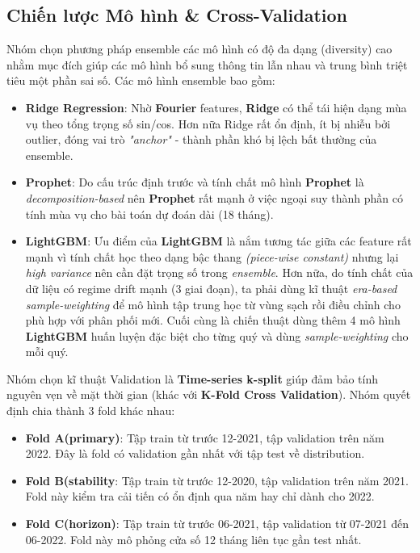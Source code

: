 \documentclass{article}
\begin{document}
\subsection{Chiến lược Mô hình \& Cross-Validation}

Nhóm chọn phương pháp ensemble các mô hình có độ đa dạng (diversity) cao
nhằm mục đích giúp các mô hình bổ sung thông tin lẫn nhau và trung bình triệt tiêu một phần sai số. Các mô hình ensemble bao gồm:
\begin{itemize}
    \item \textbf{Ridge Regression}: Nhờ \textbf{Fourier} features, \textbf{Ridge} có thể tái hiện dạng mùa vụ theo tổng trọng số sin/cos. Hơn nữa Ridge rất ổn định, ít bị nhiễu bởi outlier, đóng vai trò \textit{"anchor"} - thành phần khó bị lệch bất thường của ensemble.
    \item \textbf{Prophet}: Do cấu trúc định trước và tính chất mô hình \textbf{Prophet} là \textit{decomposition-based} nên \textbf{Prophet} rất mạnh ở việc ngoại suy thành phần có tính mùa vụ cho bài toán dự đoán dài (18 tháng).

    \item \textbf{LightGBM}: Ưu điểm của \textbf{LightGBM} là nắm tương tác giữa các feature rất mạnh vì tính chất học theo dạng bậc thang \textit{(piece-wise constant)} nhưng lại \textit{high variance} nên cần đặt trọng số trong \textit{ensemble}. Hơn nữa, do tính chất của dữ liệu có regime drift mạnh (3 giai đoạn), ta phải dùng kĩ thuật \textit{era-based sample-weighting} để mô hình tập trung học từ vùng sạch rồi điều chỉnh cho phù hợp với phân phối mới. Cuối cùng là chiến thuật dùng thêm 4 mô hình \textbf{LightGBM} huấn luyện đặc biệt cho từng quý và dùng \textit{sample-weighting} cho mỗi quý.
\end{itemize}

Nhóm chọn kĩ thuật Validation là \textbf{Time-series k-split} giúp đảm bảo tính nguyên vẹn về mặt thời gian (khác với \textbf{K-Fold Cross Validation}). Nhóm quyết định chia thành 3 fold khác nhau:
\begin{itemize}
    \item \textbf{Fold A(primary)}: Tập train từ trước 12-2021, tập validation trên năm 2022. Đây là fold có validation gần nhất với tập test về distribution.
    \item \textbf{Fold B(stability}: Tập train từ trước 12-2020, tập validation trên năm 2021. Fold này kiểm tra cải tiến có ổn định qua năm hay chỉ dành cho 2022.
    \item \textbf{Fold C(horizon)}: Tập train từ trước 06-2021, tập validation từ 07-2021 đến 06-2022. Fold này mô phỏng cửa số 12 tháng liên tục gần test nhất. 
\end{itemize}
\end{document}
